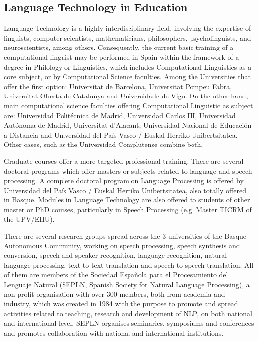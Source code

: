 \begin{multicols}{2}
\subsection{Language Technology in Education}
   Language Technology is a highly interdisciplinary field, involving the expertise of linguists, computer scientists, mathematicians, philosophers, psycholinguists, and neuroscientists, among others. Consequently, the current basic training of a computational linguist may be performed in Spain within the framework of a degree in Philology or Linguistics, which includes Computational Linguistics as a core subject, or by Computational Science faculties. Among the Universities that offer the first option: Universitat de Barcelona, Universitat Pompeu Fabra, Universitat Oberta de Catalunya and Universidade de Vigo. On the other hand, main computational science faculties offering Computational Linguistic as subject are: Universidad Politécnica de Madrid, Universidad Carlos III, Universidad Autónoma de Madrid, Universitat d’Alacant, Universidad Nacional de Educación a Distancia and Universidad del País Vasco / Euskal Herriko Unibertsitatea. Other cases, such as the Universidad Complutense combine both.

Graduate courses offer a more targeted professional training. There are several doctoral programs which offer masters or subjects related to language and speech processing. A complete doctoral program on Language Processing is offered by Universidad del País Vasco / Euskal Herriko Unibertsitatea, also totally offered in Basque. Modules in Language Technology are also offered to students of other master or PhD courses, particularly in Speech Processing (e.g. Master TICRM of the UPV/EHU). 

There are several research groups spread across the 3 universities of the Basque Autonomous Community, working on speech processing, speech synthesis and conversion, speech and speaker recognition, language recognition, natural language processing, text-to-text translation and speech-to-speech translation. All of them are members of the Sociedad Española para el Procesamiento del Lenguaje Natural (SEPLN, Spanish Society for Natural Language Processing), a non-profit organisation with over 300 members, both from academia and industry, which was created in 1984 with the purpose to promote and spread activities related to teaching, research and development of NLP, on both national and international level. SEPLN organises seminaries, symposiums and conferences and promotes collaboration with national and international institutions.


\end{multicols}
